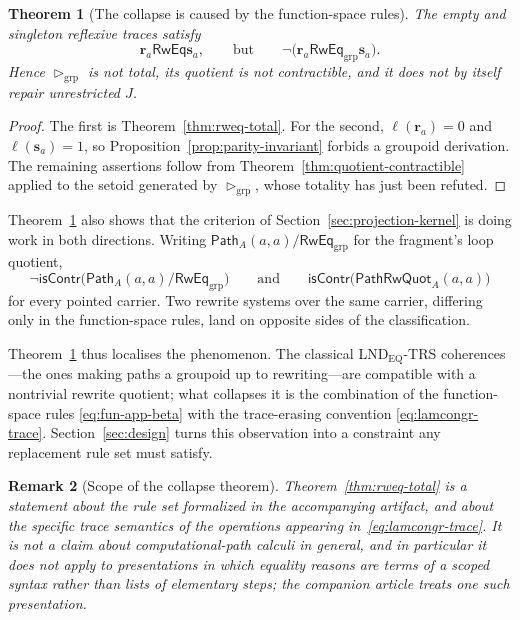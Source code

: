 \documentclass[10pt,reqno]{amsart}
\newtheorem{theorem}{Theorem}[section]
\newtheorem{remark}[theorem]{Remark}
\newcommand{\isContr}{\mathsf{isContr}}
\newcommand{\PathTy}{\mathsf{Path}}
\newcommand{\PRW}{\mathsf{PathRwQuot}}
\begin{document}
\begin{theorem}[The collapse is caused by the function-space rules]
\label{thm:sharpness}
The empty and singleton reflexive traces satisfy
\[
 \mathbf r_a
 \mathrel{\mathsf{RwEq}}
 \mathbf s_a,
 \qquad\text{but}\qquad
 \neg\bigl(\mathbf r_a
   \mathrel{\mathsf{RwEq}}_{\mathrm{grp}}\mathbf s_a\bigr).
\tag{11.7}\label{eq:sharpness}
\]
Hence \(\triangleright_{\mathrm{grp}}\) is not total, its quotient is not
contractible, and it does not by itself repair unrestricted \(J\).
\end{theorem}

\begin{proof}
The first is Theorem~\ref{thm:rweq-total}.  For the second,
\(\ell(\mathbf r_a)=0\) and \(\ell(\mathbf s_a)=1\), so
Proposition~\ref{prop:parity-invariant} forbids a groupoid derivation.  The
remaining assertions follow from Theorem~\ref{thm:quotient-contractible} applied
to the setoid generated by \(\triangleright_{\mathrm{grp}}\), whose totality has
just been refuted.
\end{proof}

Theorem~\ref{thm:sharpness} also shows that the criterion of
Section~\ref{sec:projection-kernel} is doing work in both directions.  Writing
\(\PathTy_A(a,a)/\mathord{\mathsf{RwEq}}_{\mathrm{grp}}\) for the fragment's loop
quotient,
\[
 \neg\isContr\bigl(\PathTy_A(a,a)/\mathord{\mathsf{RwEq}}_{\mathrm{grp}}\bigr)
 \qquad\text{and}\qquad
 \isContr\bigl(\PRW_A(a,a)\bigr)
\tag{11.8}\label{eq:fragment-vs-full}
\]
for every pointed carrier.  Two rewrite systems over the same carrier, differing
only in the function-space rules, land on opposite sides of the classification.

Theorem~\ref{thm:sharpness} thus localises the phenomenon.  The classical
LND\(_{\mathrm{EQ}}\)-TRS coherences---the ones making paths a groupoid up to
rewriting---are compatible with a nontrivial rewrite quotient; what collapses it
is the combination of the function-space rules \eqref{eq:fun-app-beta} with the
trace-erasing convention \eqref{eq:lamcongr-trace}.
Section~\ref{sec:design} turns this observation into a constraint any
replacement rule set must satisfy.

\begin{remark}[Scope of the collapse theorem]
\label{rem:collapse-scope}
Theorem~\ref{thm:rweq-total} is a statement about the rule set formalized in the
accompanying artifact, and about the specific trace semantics of the operations
appearing in~\eqref{eq:lamcongr-trace}.  It is not a claim about
computational-path calculi in general, and in particular it does not apply to
presentations in which equality reasons are terms of a scoped syntax rather than
lists of elementary steps; the companion article
\cite{ScopedTraceCalculus2026} treats one such presentation.
\end{remark}
\end{document}

